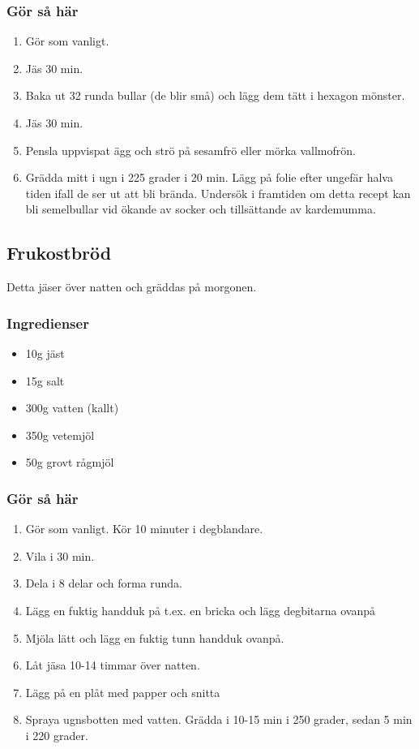 \documentclass[a4paper,11pt,twocolumn]{article}
\begin{document}
\subsubsection*{Gör så här}
\begin{enumerate}[label=\arabic*.]
    \item Gör som vanligt.
    \item Jäs 30 min.
    \item Baka ut 32 runda bullar (de blir små) och lägg dem tätt i hexagon mönster.
    \item Jäs 30 min.
    \item Pensla uppvispat ägg och strö på sesamfrö eller mörka vallmofrön.
    \item Grädda mitt i ugn i 225 grader i 20 min. Lägg på folie efter ungefär halva tiden ifall de ser ut att bli brända.
    Undersök i framtiden om detta recept kan bli semelbullar vid ökande av socker och tillsättande av kardemumma.
\end{enumerate}


\subsection{Frukostbröd}
Detta jäser över natten och gräddas på morgonen.
\subsubsection*{Ingredienser}
\begin{itemize}[noitemsep]
    \item 10g jäst
    \item 15g salt
    \item 300g vatten (kallt)
    \item 350g vetemjöl
    \item 50g grovt rågmjöl
\end{itemize}
\subsubsection*{Gör så här}
\begin{enumerate}[label=\arabic*.]
    \item Gör som vanligt. Kör 10 minuter i degblandare.
    \item Vila i 30 min.
    \item Dela i 8 delar och forma runda.
    \item Lägg en fuktig handduk på t.ex. en bricka och lägg degbitarna ovanpå
    \item Mjöla lätt och lägg en fuktig tunn handduk ovanpå.
    \item Låt jäsa 10-14 timmar över natten.
    \item Lägg på en plåt med papper och snitta
    \item Spraya ugnsbotten med vatten. Grädda i 10-15 min i 250 grader, sedan 5 min i 220 grader.
\end{enumerate}
\end{document}
